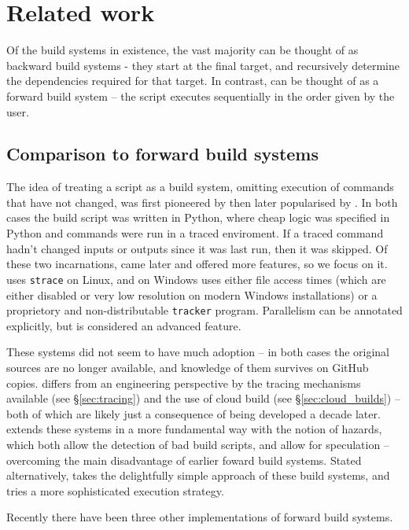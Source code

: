 \section{Related work}
\label{sec:related}

Of the build systems in existence, the vast majority can be thought of as backward build systems - they start at the final target, and recursively determine the dependencies required for that target. In contrast, \Rattle can be thought of as a forward build system -- the script executes sequentially in the order given by the user.

\subsection{Comparison to forward build systems}

The idea of treating a script as a build system, omitting execution of commands that have not changed, was first pioneered by \Memoize \cite{memoize} then later popularised by \Fabricate \cite{fabricate}. In both cases the build script was written in Python, where cheap logic was specified in Python and commands were run in a traced enviroment. If a traced command hadn't changed inputs or outputs since it was last run, then it was skipped. Of these two incarnations, \Fabricate came later and offered more features, so we focus on it. \Fabricate uses \texttt{strace} on Linux, and on Windows uses either file access times (which are either disabled or very low resolution on modern Windows installations) or a proprietory and non-distributable \texttt{tracker} program. Parallelism can be annotated explicitly, but is considered an advanced feature.

These systems did not seem to have much adoption -- in both cases the original sources are no longer available, and knowledge of them survives on GitHub copies. \Rattle differs from an engineering perspective by the tracing mechanisms available (see \S\ref{sec:tracing}) and the use of cloud build (see \S\ref{sec:cloud_builds}) -- both of which are likely just a consequence of being developed a decade later. \Rattle extends these systems in a more fundamental way with the notion of hazards, which both allow the detection of bad build scripts, and allow for speculation -- overcoming the main disadvantage of earlier foward build systems. Stated alternatively, \Rattle takes the delightfully simple approach of these build systems, and tries a more sophisticated execution strategy.

Recently there have been three other implementations of forward build systems.


